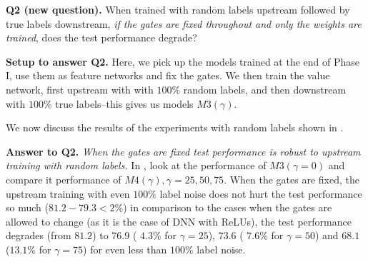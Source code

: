 \textbf{Q2 (new question).} {When trained with random labels upstream followed by true labels downstream, \emph{if the gates are fixed throughout and only the weights are trained}, does the test performance degrade?}

\textbf{Setup to answer Q2.} Here, we pick up the models trained at the end of Phase I, use them as feature networks and fix the gates. We then train the value network, first upstream with with $100\%$ random labels, and then downstream with $100\%$ true labels--this gives us models $M3(\gamma)$.

We now discuss the results of the experiments with random labels shown in .

\textbf{Answer to Q2.} \emph{When the gates are fixed test performance is robust to upstream training with random labels.} In  , look at the performance of $M3(\gamma=0)$ and compare it performance of  $M4(\gamma), \gamma=25,50,75$. When the gates are fixed, the upstream training with even $100\%$ label noise does not hurt the test performance so much ($81.2-79.3 <2\%$) in comparison to the cases when the gates are allowed to change (as it is the case of DNN with ReLUs), the test performance degrades (from $81.2$) to $76.9$ ( $ 4.3\%$ for $\gamma=25$), $73.6$ ( $7.6\%$ for $\gamma=50$) and  $68.1$ ($13.1\%$ for $\gamma=75$) for even less than $100\%$ label noise.



